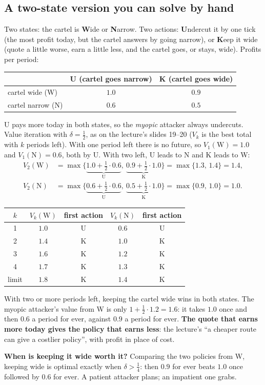 \documentclass[11pt]{article}
\begin{document}
\subsection{A two-state version you can solve by hand}
\begin{example}
Two states: the cartel is \textbf{W}ide or \textbf{N}arrow. Two actions: \textbf{U}ndercut it by one
tick (the most profit today, but the cartel answers by going narrow), or \textbf{K}eep it wide (quote a
little worse, earn a little less, and the cartel goes, or stays, wide). Profits per period:
\begin{center}
\begin{tabular}{lcc}
\toprule
& U (cartel goes narrow) & K (cartel goes wide) \\
\midrule
cartel wide (W) & $1.0$ & $0.9$ \\
cartel narrow (N) & $0.6$ & $0.5$ \\
\bottomrule
\end{tabular}
\end{center}
U pays more today in both states, so the \emph{myopic} attacker always undercuts. Value iteration with
$\delta=\tfrac12$, as on the lecture's slides 19--20 ($V_k$ is the best total with $k$ periods left).
With one period left there is no future, so $V_1(\mathrm W)=1.0$ and $V_1(\mathrm N)=0.6$, both by U.
With two left, U leads to N and K leads to W:
\begin{align*}
V_2(\mathrm W)&=\max\{\underbrace{1.0+\tfrac12\cdot0.6}_{\text{U}},\ \underbrace{0.9+\tfrac12\cdot1.0}_{\text{K}}\}=\max\{1.3,\,1.4\}=1.4,\\
V_2(\mathrm N)&=\max\{\underbrace{0.6+\tfrac12\cdot0.6}_{\text{U}},\ \underbrace{0.5+\tfrac12\cdot1.0}_{\text{K}}\}=\max\{0.9,\,1.0\}=1.0.
\end{align*}
\begin{center}
\begin{tabular}{ccccc}
\toprule
$k$ & $V_k(\mathrm W)$ & first action & $V_k(\mathrm N)$ & first action \\
\midrule
1 & $1.0$ & U & $0.6$ & U \\
2 & $1.4$ & K & $1.0$ & K \\
3 & $1.6$ & K & $1.2$ & K \\
4 & $1.7$ & K & $1.3$ & K \\
limit & $1.8$ & K & $1.4$ & K \\
\bottomrule
\end{tabular}
\end{center}
With two or more periods left, keeping the cartel wide wins in both states. The myopic attacker's value
from W is only $1+\tfrac12\cdot 1.2=1.6$: it takes $1.0$ once and then $0.6$ a period for ever, against
$0.9$ a period for ever. \textbf{The quote that earns more today gives the policy that earns less}: the
lecture's ``a cheaper route can give a costlier policy'', with profit in place of cost.
\end{example}
\textbf{When is keeping it wide worth it?} Comparing the two policies from W, keeping wide is optimal
exactly when $\delta>\tfrac14$: then $0.9$ for ever beats $1.0$ once followed by $0.6$ for ever. A patient
attacker plans; an impatient one grabs.
\end{document}
